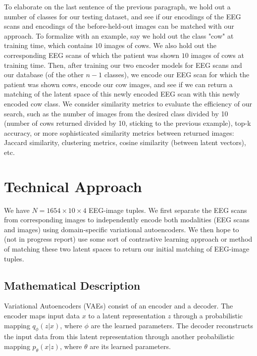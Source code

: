 \documentclass{article}
\begin{document}
To elaborate on the last sentence of the previous paragraph, we hold out a number of classes for our testing dataset, and see if our encodings of the EEG scans and encodings of the before-held-out images can be matched with our approach. To formalize with an example, say we hold out the class "cow" at training time, which contains $10$ images of cows. We also hold out the corresponding EEG scans of which the patient was shown $10$ images of cows at training time. Then, after training our two encoder models for EEG scans and our database (of the other $n - 1$ classes), we encode our EEG scan for which the patient was shown cows, encode our cow images, and see if we can return a matching of the latent space of this newly encoded EEG scan with this newly encoded cow class. We consider similarity metrics to evaluate the efficiency of our search, such as the number of images from the desired class divided by 10 (number of cows returned divided by 10, sticking to the previous example), top-k accuracy, or more sophisticated similarity metrics between returned images: Jaccard similarity, clustering metrics, cosine similarity (between latent vectors), etc. 




\section{Technical Approach}

We have $N = 1654 \times 10 \times 4$ EEG-image tuples. We first separate the EEG scans from corresponding images to independently encode both modalities (EEG scans and images) using domain-specific variational autoencoders. We then hope to (not in progress report) use some sort of contrastive learning approach or method of matching these two latent spaces to return our initial matching of EEG-image tuples.

\subsection{Mathematical Description}

Variational Autoencoders (VAEs) consist of an encoder and a decoder. The encoder maps input data $x$ to a latent representation $z$ through a probabilistic mapping $q_\phi(z|x)$, where $\phi$ are the learned parameters. The decoder reconstructs the input data from this latent representation through another probabilistic mapping $p_\theta(x|z)$, where $\theta$ are its learned parameters.
\end{document}
